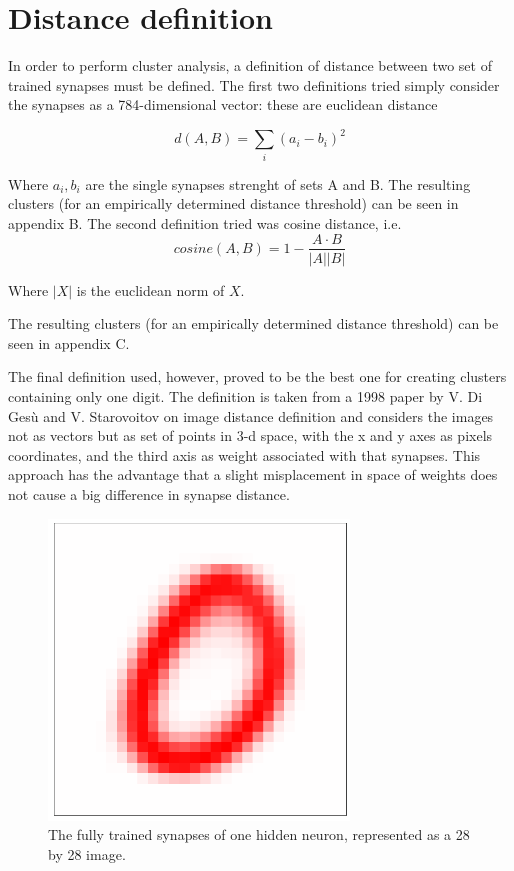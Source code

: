 \documentclass[a4paper]{report}
\begin{document}
\section{Distance definition}

In order to perform cluster analysis, a definition of distance between two set of trained synapses must be defined. The first two definitions tried simply consider the synapses as a 784-dimensional vector: these are euclidean distance

\begin{equation}
    d(A,B) = \sum_i (a_i-b_i)^2
\end{equation}

Where $a_i, b_i$ are the single synapses strenght of sets A and B. The resulting clusters (for an empirically determined distance threshold) can be seen in appendix B.
The second definition tried was cosine distance, i.e.
\begin{equation}
    cosine(A,B) = 1 - \frac{A \cdot B}{|A||B|} 
\end{equation}

Where $|X|$ is the euclidean norm of $X$.

The resulting clusters (for an empirically determined distance threshold) can be seen in appendix C.

The final definition used, however, proved to be the best one for creating clusters containing only one digit. The definition is taken from a 1998 paper by V. Di Gesù and V. Starovoitov on image distance definition and considers the images not as vectors but as set of points in 3-d space, with the x and y axes as pixels coordinates, and the third axis as weight associated with that synapses. This approach has the advantage that a slight misplacement in space of weights does not cause a big difference in synapse distance.

\begin{figure} [H]
    \centering
    \includegraphics [width=8cm ] {o/zero.png}
    \caption{The fully trained synapses of one hidden neuron, represented as a 28 by 28 image.}
    \label{zero}
\end{figure}
\end{document}
